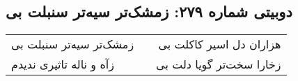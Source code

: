 \begin{center}
\section*{دوبیتی شماره ۲۷۹: زمشک‌تر سیه‌تر سنبلت بی}
\label{sec:279}
\begin{longtable}{l p{0.5cm} r}
زمشک‌تر سیه‌تر سنبلت بی
&&
هزاران دل اسیر کاکلت بی
\\
زآه و ناله تاثیری ندیدم
&&
زخارا سخت‌تر گویا دلت بی
\\
\end{longtable}
\end{center}
